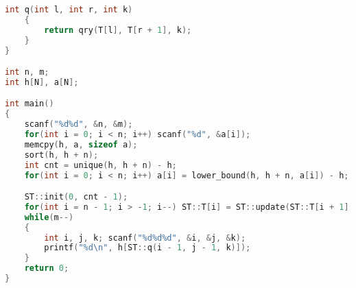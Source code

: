 \begin{lstlisting}[language=C++]
    int q(int l, int r, int k)
    {
        return qry(T[l], T[r + 1], k);
    }
}

int n, m;
int h[N], a[N];

int main()
{
	scanf("%d%d", &n, &m);
    for(int i = 0; i < n; i++) scanf("%d", &a[i]);
    memcpy(h, a, sizeof a);
    sort(h, h + n);
    int cnt = unique(h, h + n) - h;
    for(int i = 0; i < n; i++) a[i] = lower_bound(h, h + n, a[i]) - h;

    ST::init(0, cnt - 1);
    for(int i = n - 1; i > -1; i--) ST::T[i] = ST::update(ST::T[i + 1], a[i]);
    while(m--)
    {
        int i, j, k; scanf("%d%d%d", &i, &j, &k);
        printf("%d\n", h[ST::q(i - 1, j - 1, k)]);
    }
    return 0;
}
	
\end{lstlisting}
